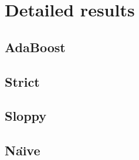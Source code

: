 

\chapter{Detailed results}
\label{chapter:allgraphs}

\section{AdaBoost}

\section{Strict}

\section{Sloppy}

\section{Na\"{\i}ve}
